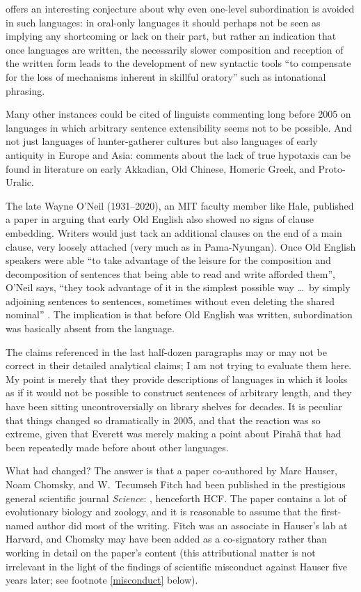 \documentclass[output=paper,colorlinks,citecolor=brown
]{langscibook}
\begin{document}
\citet[509]{Mithun84} offers an interesting conjecture
about why even one-level subordination is avoided in such languages:
in oral-only languages it should perhaps not be seen as implying any
shortcoming or lack on their part, but rather an indication that once
languages are written, the necessarily slower composition and reception
of the written form leads to the development of new syntactic tools
``to compensate for the loss of mechanisms inherent in skillful oratory''
such as intonational phrasing.

Many other instances could be cited of linguists commenting long before
2005 on languages in which arbitrary sentence extensibility seems not
to be possible. And not just languages of hunter-gatherer cultures
but also languages of early antiquity in Europe and Asia: comments
about the lack of true hypotaxis can be found in literature on
early Akkadian, Old Chinese, Homeric Greek, and Proto-Uralic.

The late Wayne O'Neil (1931--2020), an MIT faculty member like Hale,
published a paper in \citeyear{ONeil77} arguing that early Old English
also showed no signs of clause embedding. Writers would just tack an
additional clauses on the end of a main clause, very loosely attached
(very much as in Pama-Nyungan). Once Old English speakers were able
``to take advantage of the leisure for the composition and decomposition
of sentences that being able to read and write afforded them'', O'Neil
says, ``they took advantage of it in the simplest possible way \ldots\
by simply adjoining sentences to sentences, sometimes without even
deleting the shared nominal'' \citeyearpar[210]{ONeil77}. The implication
is that before Old English was written, subordination was basically
absent from the language.\label{page-non-infinite-languages-end}

The claims referenced in the last half-dozen paragraphs may or may not
be correct in their detailed analytical claims; I am not trying to
evaluate them here. My point is merely that they provide descriptions
of languages in which it looks as if it would not be possible to
construct sentences of arbitrary length, and they have been sitting
uncontroversially on library shelves for decades. It is peculiar that
things changed so dramatically in 2005, and that the reaction was so
extreme, given that Everett was merely making a point about Pirah{\~a}
that had been repeatedly made before about other languages.

What had changed? The answer is that a paper co-authored by Marc
Hauser, Noam Chomsky, and W.\ Tecumseh Fitch had been published in
the prestigious general scientific journal \textit{Science}: , henceforth HCF. The paper contains
a lot of evolutionary biology and zoology, and it is reasonable to
assume that the first-named author did most of the writing. Fitch was
an associate in Hauser's lab at Harvard, and Chomsky may have been
added as a co-signatory rather than working in detail on the paper's
content (this attributional matter is not irrelevant in the light of
the findings of scientific misconduct against Hauser five years later;
see footnote \ref{misconduct} below).
\end{document}
